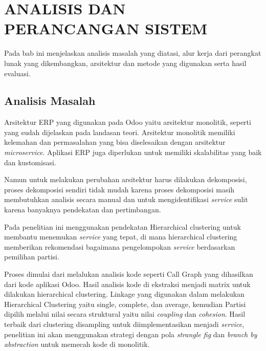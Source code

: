 \chapter{ANALISIS DAN PERANCANGAN SISTEM}
\vspace{4.5pt}

Pada bab ini menjelaskan analisis masalah yang diatasi, alur kerja dari perangkat lunak yang dikembangkan, arsitektur dan metode yang digunakan serta hasil evaluasi.\\

\section{Analisis Masalah}
Arsitektur ERP yang digunakan pada Odoo yaitu arsitektur monolitik, seperti yang sudah dijelaskan pada landasan teori. Arsitektur monolitik memiliki kelemahan dan permasalahan yang bisa diselesaikan dengan arsitektur \textit{microservice}. Aplikasi ERP juga diperlukan untuk memiliki skalabilitas yang baik dan kustomisasi.

Namun untuk melakukan perubahan arsitektur harus dilakukan dekomposisi, proses dekomposisi sendiri tidak mudah karena proses dekomposisi masih membutuhkan analisis secara manual dan untuk mengidentifikasi \textit{service} sulit karena banyaknya pendekatan dan pertimbangan.

Pada penelitian ini menggunakan pendekatan Hierarchical clustering untuk membantu menemukan \textit{service} yang tepat, di mana hierarchical clustering memberikan rekomendasi bagaimana pengelompokan \textit{service} berdasarkan pemilihan partisi.

Proses dimulai dari melalukan analisis kode seperti Call Graph yang dihasilkan dari kode aplikasi Odoo. Hasil analisis kode di ekstraksi menjadi matrix untuk dilakukan hierarchical clustering. Linkage yang digunakan dalam melakukan Hierarchical Clustering yaitu single, complete, dan average, kemudian  Partisi  dipilih melalui nilai secara struktural yaitu nilai \textit{coupling}  dan \textit{cohesion}. Hasil terbaik dari clustering disampling untuk diimplementasikan menjadi \textit{service}, penelitian ini akan menggunakan strategi dengan pola \textit{strangle fig } dan \textit{branch by abstraction} untuk memecah kode di monolitik.


